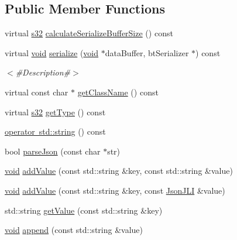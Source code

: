 \subsection*{Public Member Functions}
\begin{DoxyCompactItemize}
\item 
virtual \mbox{\hyperlink{_util_8h_aa62c75d314a0d1f37f79c4b73b2292e2}{s32}} \mbox{\hyperlink{classnjli_1_1_json_j_l_i_ae04065ef213ec0a41246d7a171a57593}{calculate\+Serialize\+Buffer\+Size}} () const
\item 
virtual \mbox{\hyperlink{_thread_8h_af1e856da2e658414cb2456cb6f7ebc66}{void}} \mbox{\hyperlink{classnjli_1_1_json_j_l_i_aa1e476cfc10ae610e4c9b8a62a5c2114}{serialize}} (\mbox{\hyperlink{_thread_8h_af1e856da2e658414cb2456cb6f7ebc66}{void}} $\ast$data\+Buffer, bt\+Serializer $\ast$) const
\begin{DoxyCompactList}\small\item\em $<$\#\+Description\#$>$ \end{DoxyCompactList}\item 
virtual const char $\ast$ \mbox{\hyperlink{classnjli_1_1_json_j_l_i_ad4d2f9c24a3b0758ce3e83fd9f5f2620}{get\+Class\+Name}} () const
\item 
virtual \mbox{\hyperlink{_util_8h_aa62c75d314a0d1f37f79c4b73b2292e2}{s32}} \mbox{\hyperlink{classnjli_1_1_json_j_l_i_afb825b630c4ee8489b270a189201ddac}{get\+Type}} () const
\item 
\mbox{\hyperlink{classnjli_1_1_json_j_l_i_a0d027db8f384f03c29eb34d6f17c9255}{operator std\+::string}} () const
\item 
bool \mbox{\hyperlink{classnjli_1_1_json_j_l_i_ac6c67daeea7d4b60ca3cd20f7a8403d5}{parse\+Json}} (const char $\ast$str)
\item 
\mbox{\hyperlink{_thread_8h_af1e856da2e658414cb2456cb6f7ebc66}{void}} \mbox{\hyperlink{classnjli_1_1_json_j_l_i_aab69baa38139f33c4aac4ae2836b57bd}{add\+Value}} (const std\+::string \&key, const std\+::string \&value)
\item 
\mbox{\hyperlink{_thread_8h_af1e856da2e658414cb2456cb6f7ebc66}{void}} \mbox{\hyperlink{classnjli_1_1_json_j_l_i_a83bf1f54b655a8ffcb44862665dab40b}{add\+Value}} (const std\+::string \&key, const \mbox{\hyperlink{classnjli_1_1_json_j_l_i}{Json\+J\+LI}} \&value)
\item 
std\+::string \mbox{\hyperlink{classnjli_1_1_json_j_l_i_aaaf1576600de948cea4e666ca071f483}{get\+Value}} (const std\+::string \&key)
\item 
\mbox{\hyperlink{_thread_8h_af1e856da2e658414cb2456cb6f7ebc66}{void}} \mbox{\hyperlink{classnjli_1_1_json_j_l_i_a7487f2f83659dfb1a3f1bf75ed9f6e47}{append}} (const std\+::string \&value)

\end{DoxyCompactItemize}
